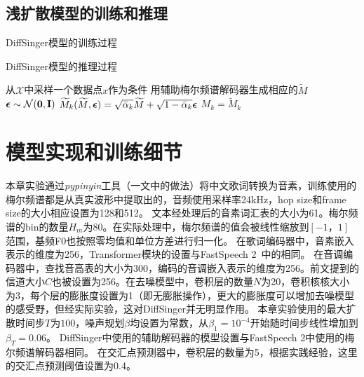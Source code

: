 \subsection{浅扩散模型的训练和推理}
\begin{algorithm}[h]
\caption{DiffSinger模型的训练过程}
\label{alg:training}
\end{algorithm}

\begin{algorithm}[h]
\caption{DiffSinger模型的推理过程}
\label{alg:sampling}
    从$\mathcal{X}$中采样一个数据点$x$作为条件\;
    用辅助梅尔频谱解码器生成相应的$\widetilde{M}$\;
    ${\boldsymbol{\epsilon}}\sim\mathcal{N}(\mathbf{0},\mathbf{I})$\;
    $\widetilde{M}_k(\widetilde{M}, {\boldsymbol{\epsilon}}) = \sqrt{\bar\alpha_k}\widetilde{M} + \sqrt{1-\bar\alpha_k}{\boldsymbol{\epsilon}}$\;
    $M_k =  \widetilde{M}_k$\;
\end{algorithm}
\section{模型实现和训练细节}
\label{sec:svs_inference}
本章实验通过\textit{pypinyin}工具（\citet{ren2020deepsinger}一文中的做法）将中文歌词转换为音素，训练使用的梅尔频谱都是从真实波形中提取出的，音频使用采样率24kHz，hop size和frame size的大小相应设置为128和512。
文本经处理后的音素词汇表的大小为61。梅尔频谱的bin的数量$H_m$为80。在实际处理中，梅尔频谱的值会被线性缩放到$[-1，1]$范围，基频F0也按照零均值和单位方差进行归一化。
在歌词编码器中，音素嵌入表示的维度为256，Transformer模块的设置与FastSpeech 2~\citep{ren2021fastspeech}中的相同。
在音调编码器中，查找音高表的大小为300，编码的音调嵌入表示的维度为256。前文提到的信道大小$C$也被设置为256。在去噪模型中，卷积层的数量$N$为20，卷积核核大小为3，每个层的膨胀度设置为1（即无膨胀操作），更大的膨胀度可以增加去噪模型的感受野，但经实际实验，这对DiffSinger并无明显作用。
本章实验使用的最大扩散时间步$T$为$100$，噪声规划$\beta$均设置为常数，从$\beta_1=10^{-4}$开始随时间步线性增加到$\beta_T=0.06$。
DiffSinger中使用的辅助解码器的模型设置与FastSpeech 2中使用的梅尔频谱解码器相同。
在交汇点预测器中，卷积层的数量为5，根据实践经验，这里的交汇点预测阈值设置为0.4。


